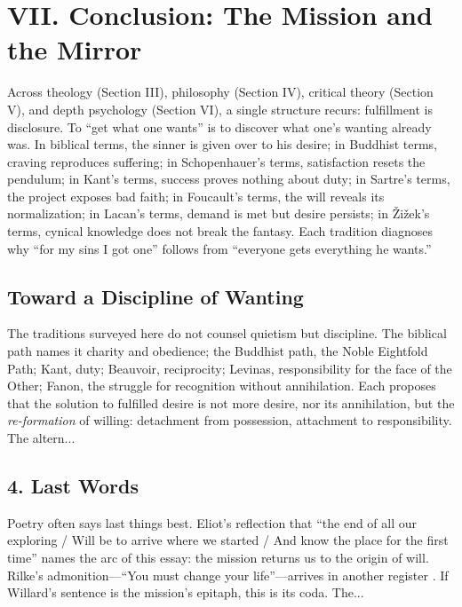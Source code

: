 \section*{VII. Conclusion: The Mission and the Mirror}
\label{sec:vii-conclusion-the-mission-and-the-mirror}

Across theology (Section III), philosophy (Section IV), critical theory (Section V), and depth 
psychology (Section VI), a single structure recurs: fulfillment is disclosure. To ``get what 
one wants'' is to discover what one's wanting already was. In biblical terms, the sinner is 
given over to his desire; in Buddhist terms, craving reproduces suffering; in Schopenhauer's 
terms, satisfaction resets the pendulum; in Kant's terms, success proves nothing about duty; 
in Sartre's terms, the project exposes bad faith; in Foucault's terms, the will reveals its 
normalization; in Lacan's terms, demand is met but desire persists; in Žižek's terms, cynical 
knowledge does not break the fantasy. Each tradition diagnoses why ``for my sins I got one'' 
follows from ``everyone gets everything he wants.''

\subsection*{Toward a Discipline of Wanting}
\label{ssec:3-toward-a-discipline-of-wanting}
The traditions surveyed here do not counsel quietism but discipline. The biblical path names it charity and obedience; the Buddhist path, the Noble Eightfold Path; Kant, duty; Beauvoir, reciprocity; Levinas, responsibility for the face of the Other; Fanon, the struggle for recognition without annihilation. Each proposes that the solution to fulfilled desire is not more desire, nor its annihilation, but the \emph{re-formation} of willing: detachment from possession, attachment to responsibility. The altern...
\subsection*{4. Last Words}
\label{ssec:4-last-words}
Poetry often says last things best. Eliot’s reflection that ``the end of all our exploring / Will be to arrive where we started / And know the place for the first time''  names the arc of this essay: the mission returns us to the origin of will. Rilke’s admonition---``You must change your life''---arrives in another register \parencite[Snow trans., 2009]{RilkeElegies2009}. If Willard’s sentence is the mission’s epitaph, this is its coda. The...
